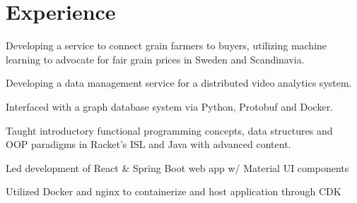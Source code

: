 \documentclass[letterpaper]{resume} %
\begin{document}
\begin{minipage}[t]{0.66\textwidth} %

\section{Experience}

Developing a service to connect grain farmers to buyers,
utilizing machine learning to advocate for fair grain prices in Sweden and Scandinavia.

\sectionspace %

\vspace{\topsep} %
\begin{tightitemize}
  \item Developing a data management service for a distributed video analytics system.
  \item Interfaced with a graph database system via Python, Protobuf and Docker.
\end{tightitemize}

\sectionspace %

Taught introductory functional programming concepts, data structures and \\
OOP paradigms in Racket's ISL and Java with advanced content. \\
\sectionspace

\begin{tightitemize}
  \item Led development of React \& Spring Boot web app w/ Material UI components
  \item Utilized Docker and nginx to containerize and host application through CDK
\end{tightitemize}


\end{minipage}
\end{document}
